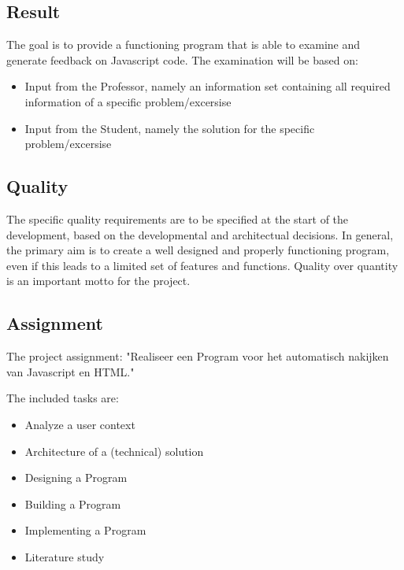 \documentclass{article}
\begin{document}
\subsection{Result}

The goal is to provide a functioning program that is able to examine and generate feedback on Javascript code. The examination will be based on:

\begin{itemize}
  \item Input from the Professor, namely an information set containing all required information of a specific problem/excersise
  \item Input from the Student, namely the solution for the specific problem/excersise
\end{itemize}

\subsection{Quality}

The specific quality requirements are to be specified at the start of the development, based on the developmental and architectual decisions. In general, the primary aim is to create a well designed and properly functioning program, even if this leads to a limited set of features and functions. Quality over quantity is an important motto for the project.

\subsection{Assignment}

The project assignment: "Realiseer een Program voor het automatisch nakijken van Javascript en HTML."

The included tasks are:
\begin{itemize}
  \item Analyze a user context
  \item Architecture of a (technical) solution
  \item Designing a Program
  \item Building a Program
  \item Implementing a Program
  \item Literature study
\end{itemize}
\end{document}
